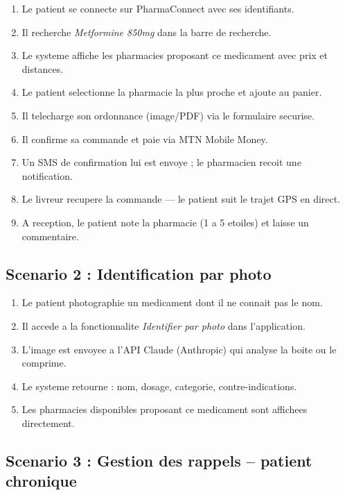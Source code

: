 \documentclass[12pt,a4paper]{report}
\begin{document}
\begin{enumerate}[label=\textbf{Etape \arabic*.},leftmargin=*]
    \item Le patient se connecte sur PharmaConnect avec ses identifiants.
    \item Il recherche \textit{Metformine 850mg} dans la barre de recherche.
    \item Le systeme affiche les pharmacies proposant ce medicament avec prix et distances.
    \item Le patient selectionne la pharmacie la plus proche et ajoute au panier.
    \item Il telecharge son ordonnance (image/PDF) via le formulaire securise.
    \item Il confirme sa commande et paie via MTN Mobile Money.
    \item Un SMS de confirmation lui est envoye ; le pharmacien recoit une notification.
    \item Le livreur recupere la commande --- le patient suit le trajet GPS en direct.
    \item A reception, le patient note la pharmacie (1 a 5 etoiles) et laisse un commentaire.
\end{enumerate}

\subsection{Scenario 2 : Identification par photo}

\begin{enumerate}[label=\textbf{Etape \arabic*.},leftmargin=*]
    \item Le patient photographie un medicament dont il ne connait pas le nom.
    \item Il accede a la fonctionnalite \textit{Identifier par photo} dans l'application.
    \item L'image est envoyee a l'API Claude (Anthropic) qui analyse la boite ou le comprime.
    \item Le systeme retourne : nom, dosage, categorie, contre-indications.
    \item Les pharmacies disponibles proposant ce medicament sont affichees directement.
\end{enumerate}

\subsection{Scenario 3 : Gestion des rappels -- patient chronique}
\end{document}
